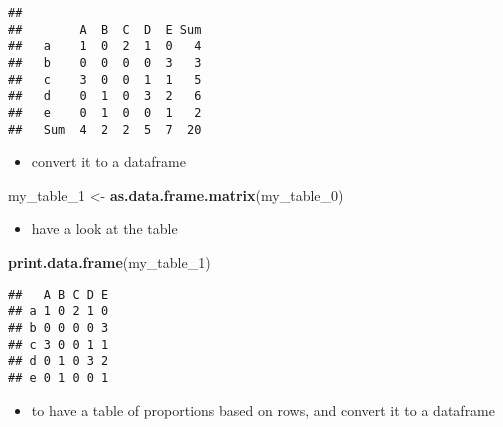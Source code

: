 \documentclass[
]{article}
\newenvironment{Shaded}{\begin{snugshade}}{\end{snugshade}}
\newcommand{\DataTypeTok}[1]{\textcolor[rgb]{0.13,0.29,0.53}{#1}}
\newcommand{\DecValTok}[1]{\textcolor[rgb]{0.00,0.00,0.81}{#1}}
\newcommand{\KeywordTok}[1]{\textcolor[rgb]{0.13,0.29,0.53}{\textbf{#1}}}
\newcommand{\NormalTok}[1]{#1}
\newcommand{\OperatorTok}[1]{\textcolor[rgb]{0.81,0.36,0.00}{\textbf{#1}}}
\newcommand{\StringTok}[1]{\textcolor[rgb]{0.31,0.60,0.02}{#1}}
\providecommand{\tightlist}{%
  \setlength{\itemsep}{0pt}\setlength{\parskip}{0pt}}
\begin{document}
\begin{verbatim}
##      
##        A  B  C  D  E Sum
##   a    1  0  2  1  0   4
##   b    0  0  0  0  3   3
##   c    3  0  0  1  1   5
##   d    0  1  0  3  2   6
##   e    0  1  0  0  1   2
##   Sum  4  2  2  5  7  20
\end{verbatim}

\begin{itemize}
\tightlist
\item
  convert it to a dataframe
\end{itemize}

\begin{Shaded}
\begin{Highlighting}[]
\NormalTok{my_table_}\DecValTok{1}\NormalTok{ <-}\StringTok{ }\KeywordTok{as.data.frame.matrix}\NormalTok{(my_table_}\DecValTok{0}\NormalTok{)}
\end{Highlighting}
\end{Shaded}

\begin{itemize}
\tightlist
\item
  have a look at the table
\end{itemize}

\begin{Shaded}
\begin{Highlighting}[]
\KeywordTok{print.data.frame}\NormalTok{(my_table_}\DecValTok{1}\NormalTok{)}
\end{Highlighting}
\end{Shaded}

\begin{verbatim}
##   A B C D E
## a 1 0 2 1 0
## b 0 0 0 0 3
## c 3 0 0 1 1
## d 0 1 0 3 2
## e 0 1 0 0 1
\end{verbatim}

\begin{itemize}
\tightlist
\item
  to have a table of proportions based on rows, and convert it to a
  dataframe
\end{itemize}

\begin{Shaded}
\end{Shaded}
\end{document}
